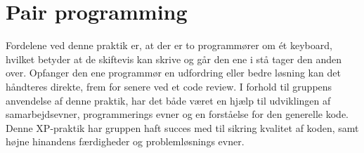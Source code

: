 \section{Pair programming}\label{sec:pairprogramming}
Fordelene ved denne praktik er, at der er to programmører om ét keyboard, 
hvilket betyder at de skiftevis kan skrive og går den ene i stå tager den anden over. 
Opfanger den ene programmør en udfordring eller bedre løsning kan det håndteres direkte, 
frem for senere ved et code review. I forhold til gruppens anvendelse af denne praktik, har det både været en hjælp til 
udviklingen af samarbejdsevner, programmerings evner og en forståelse for den generelle kode. \\

Denne XP-praktik har gruppen haft succes med til sikring kvalitet af koden, samt højne hinandens færdigheder og problemløsnings evner.
